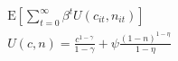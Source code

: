 	\begin{align}
		\mathrm{E}\left[\sum_{t=0}^{\infty} \beta^{t} U\left(c_{i t}, n_{i t}\right)\right]\\
		U(c, n)=\frac{c^{1-\gamma}}{1-\gamma}+\psi \frac{(1-n)^{1-\eta}}{1-\eta}
	\end{align}
